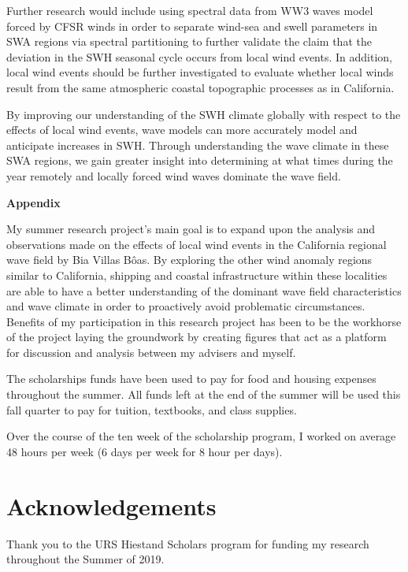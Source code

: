 \documentclass[12pt,twoside]{article}
\begin{document}
Further research would include using spectral data from WW3 waves model forced by CFSR winds in order to separate wind-sea and swell parameters in SWA regions via spectral partitioning \cite{portilla2009spectral} to further validate the claim that the deviation in the SWH seasonal cycle occurs from local wind events. In addition, local wind events should be further investigated to evaluate whether local winds result from the same atmospheric coastal topographic processes as in California. 

By improving our understanding of the SWH climate globally with respect to the effects of local wind events, wave models can more accurately model and anticipate increases in SWH. Through understanding the wave climate in these SWA regions, we gain greater insight into determining at what times during the year remotely and locally forced wind waves dominate the wave field. 

\begin{center}
{\bf\large{Appendix}}\\
\end{center}

My summer research project’s main goal is to expand upon the analysis and observations made on the effects of local wind events in the California regional wave field by Bia Villas B\^oas. By exploring the other wind anomaly regions similar to California, shipping and coastal infrastructure within these localities are able to have a better understanding of the dominant wave field characteristics and wave climate in order to proactively avoid problematic circumstances. Benefits of my participation in this research project has been to be the workhorse of the project laying the groundwork by creating figures that act as a platform for discussion and analysis between my advisers and myself.

The scholarships funds have been used to pay for food and housing expenses throughout the summer. All funds left at the end of the summer will be used this fall quarter to pay for tuition, textbooks, and class supplies.

Over the course of the ten week of the scholarship program, I worked on average 48 hours per week (6 days per week for 8 hour per days).

\section*{Acknowledgements}
Thank you to the URS Hiestand Scholars program for funding my research throughout the Summer of 2019. 
\end{document}
